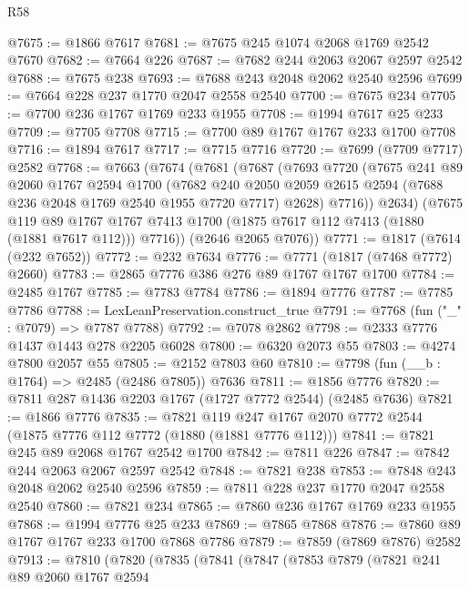 \begin{lexlean}{R58}
\begin{coremodule}
@7675 := @1866 @7617
@7681 := @7675 @245 @1074 @2068 @1769 @2542 @7670
@7682 := @7664 @226
@7687 := @7682 @244 @2063 @2067 @2597 @2542
@7688 := @7675 @238
@7693 := @7688 @243 @2048 @2062 @2540 @2596
@7699 := @7664 @228 @237 @1770 @2047 @2558 @2540
@7700 := @7675 @234
@7705 := @7700 @236 @1767 @1769 @233 @1955
@7708 := @1994 @7617 @25 @233
@7709 := @7705 @7708
@7715 := @7700 @89 @1767 @1767 @233 @1700 @7708
@7716 := @1894 @7617
@7717 := @7715 @7716
@7720 := @7699 (@7709 @7717) @2582
@7768 := @7663
    (@7674
      (@7681
        (@7687
          (@7693
            @7720
            (@7675
              @241
              @89
              @2060
              @1767
              @2594
              @1700
              (@7682
                @240
                @2050
                @2059
                @2615
                @2594
                (@7688 @236 @2048 @1769 @2540 @1955 @7720 @7717)
                @2628)
              @7716))
          @2634)
        (@7675
          @119
          @89
          @1767
          @1767
          @7413
          @1700
          (@1875 @7617 @112 @7413 (@1880 (@1881 @7617 @112)))
          @7716))
      (@2646 @2065 @7076))
@7771 := @1817 (@7614 (@232 @7652))
@7772 := @232 @7634
@7776 := @7771 (@1817 (@7468 @7772) @2660)
@7783 := @2865 @7776 @386 @276 @89 @1767 @1767 @1700
@7784 := @2485 @1767
@7785 := @7783 @7784
@7786 := @1894 @7776
@7787 := @7785 @7786
@7788 := LexLeanPreservation.construct_true
@7791 := @7768 (fun ("_" : @7079) => @7787 @7788)
@7792 := @7078 @2862
@7798 := @2333 @7776 @1437 @1443 @278 @2205 @6028
@7800 := @6320 @2073 @55
@7803 := @4274 @7800 @2057 @55
@7805 := @2152 @7803 @60
@7810 := @7798 (fun (__b : @1764) => @2485 (@2486 @7805)) @7636
@7811 := @1856 @7776
@7820 := @7811 @287 @1436 @2203 @1767 (@1727 @7772 @2544) (@2485 @7636)
@7821 := @1866 @7776
@7835 := @7821 @119 @247 @1767 @2070 @7772 @2544 (@1875 @7776 @112 @7772 (@1880 (@1881 @7776 @112)))
@7841 := @7821 @245 @89 @2068 @1767 @2542 @1700
@7842 := @7811 @226
@7847 := @7842 @244 @2063 @2067 @2597 @2542
@7848 := @7821 @238
@7853 := @7848 @243 @2048 @2062 @2540 @2596
@7859 := @7811 @228 @237 @1770 @2047 @2558 @2540
@7860 := @7821 @234
@7865 := @7860 @236 @1767 @1769 @233 @1955
@7868 := @1994 @7776 @25 @233
@7869 := @7865 @7868
@7876 := @7860 @89 @1767 @1767 @233 @1700 @7868 @7786
@7879 := @7859 (@7869 @7876) @2582
@7913 := @7810
    (@7820
      (@7835
        (@7841
          (@7847
            (@7853
              @7879
              (@7821
                @241
                @89
                @2060
                @1767
                @2594

\end{coremodule}
\end{lexlean}

